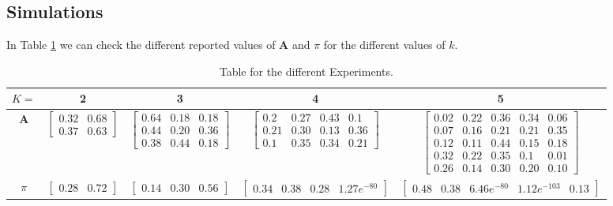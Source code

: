 \documentclass[12pt]{article}
\begin{document}
\subsection{Simulations}
In Table \ref{tab:experiments} we can check the different reported values of $\mathbf{A}$ and $\pi$ for the different values of $k$.

\begin{table}[h]
	\hskip-2cm
	\begin{tabular}{|c|c|c|c|c|}
		\hline
		$K = $& 2 & 3 & 4 & 5 \\ \hline \hline
		$\mathbf{A}$     & $\begin{bmatrix}0.32 & 0.68\\0.37 & 0.63 \end{bmatrix} $ &  $\begin{bmatrix}0.64 & 0.18 & 0.18\\0.44 & 0.20 & 0.36\\0.38 & 0.44 & 0.18 \end{bmatrix}$  &$ \begin{bmatrix}0.2 & 0.27 & 0.43 & 0.1\\0.21 & 0.30 & 0.13 & 0.36\\0.1 & 0.35 & 0.34 & 0.21\end{bmatrix}  $  & $\begin{bmatrix}0.02 & 0.22 & 0.36 & 0.34 & 0.06\\0.07 & 0.16 & 0.21 & 0.21 & 0.35\\0.12 & 0.11 & 0.44 & 0.15 & 0.18\\0.32 & 0.22 & 0.35 & 0.1 & 0.01\\0.26 & 0.14 & 0.30 & 0.20 & 0.10 \end{bmatrix}   $ \\ \hline
		$\pi$ & $\begin{bmatrix}0.28 & 0.72\end{bmatrix} $  & $\begin{bmatrix}0.14 & 0.30 & 0.56\end{bmatrix} $  & $\begin{bmatrix}0.34 & 0.38 & 0.28 & 1.27e^{-80}\end{bmatrix} $   & $\begin{bmatrix}0.48 & 0.38 & 6.46e^{-80} & 1.12e^{-103} & 0.13\end{bmatrix} $  \\ \hline
	\end{tabular}
	\caption{Table for the different Experiments.}
	\label{tab:experiments}
\end{table}
\end{document}
